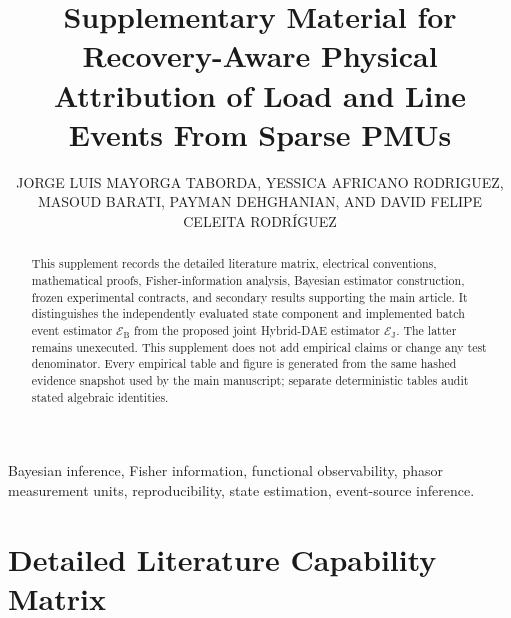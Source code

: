 \documentclass{ieeeaccess}
\begin{document}
\history{}
\doi{}
\title{Supplementary Material for Recovery-Aware Physical Attribution of Load and Line Events From Sparse PMUs}
\author{\uppercase{Jorge Luis Mayorga Taborda}, \uppercase{Yessica Africano Rodriguez}, \uppercase{Masoud Barati}, \uppercase{Payman Dehghanian}, AND \uppercase{David Felipe Celeita Rodr\'iguez}}
\address[1]{Universidad de los Andes, Bogot\'a, Colombia}
\address[2]{Department of Electrical and Computer Engineering, University of Pittsburgh, Pittsburgh, PA, USA}
\address[3]{Department of Electrical and Computer Engineering, The George Washington University, Washington, DC, USA}
\address[4]{Faculty of Engineering, Universidad de La Sabana, Ch\'ia, Colombia}

\begin{abstract}
This supplement records the detailed literature matrix, electrical conventions, mathematical proofs, Fisher-information analysis, Bayesian estimator construction, frozen experimental contracts, and secondary results supporting the main article. It distinguishes the independently evaluated state component and implemented batch event estimator $\mathcal E_{\mathrm B}$ from the proposed joint Hybrid-DAE estimator $\mathcal E_{\mathrm J}$. The latter remains unexecuted. This supplement does not add empirical claims or change any test denominator. Every empirical table and figure is generated from the same hashed evidence snapshot used by the main manuscript; separate deterministic tables audit stated algebraic identities.
\end{abstract}
\begin{keywords}
Bayesian inference, Fisher information, functional observability, phasor measurement units, reproducibility, state estimation, event-source inference.
\end{keywords}
\titlepgskip=-21pt
\maketitle

\appendices

\section{Detailed Literature Capability Matrix}
\end{document}
